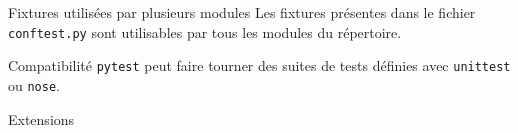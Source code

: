 \begin{frame}{Fixtures utilisées par plusieurs modules}
  Les fixtures présentes dans le fichier \texttt{conftest.py} sont utilisables par tous les modules du répertoire.
\end{frame}

\begin{frame}{Compatibilité}
  \texttt{pytest} peut faire tourner des suites de tests définies avec \texttt{unittest} ou \texttt{nose}.
\end{frame}

\begin{frame}{Extensions}
\end{frame}
